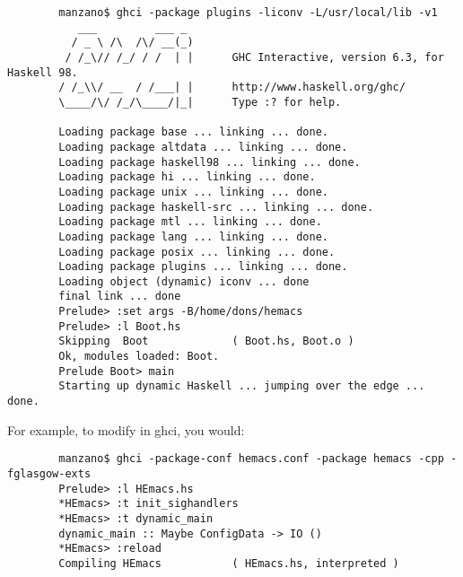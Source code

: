 \begin{verbatim}
        manzano$ ghci -package plugins -liconv -L/usr/local/lib -v1
           ___         ___ _
          / _ \ /\  /\/ __(_)
         / /_\// /_/ / /  | |      GHC Interactive, version 6.3, for Haskell 98.
        / /_\\/ __  / /___| |      http://www.haskell.org/ghc/
        \____/\/ /_/\____/|_|      Type :? for help.

        Loading package base ... linking ... done.
        Loading package altdata ... linking ... done.
        Loading package haskell98 ... linking ... done.
        Loading package hi ... linking ... done.
        Loading package unix ... linking ... done.
        Loading package haskell-src ... linking ... done.
        Loading package mtl ... linking ... done.
        Loading package lang ... linking ... done.
        Loading package posix ... linking ... done.
        Loading package plugins ... linking ... done.
        Loading object (dynamic) iconv ... done
        final link ... done
        Prelude> :set args -B/home/dons/hemacs
        Prelude> :l Boot.hs
        Skipping  Boot             ( Boot.hs, Boot.o )
        Ok, modules loaded: Boot.
        Prelude Boot> main
        Starting up dynamic Haskell ... jumping over the edge ... done.
\end{verbatim}

For example, to modify  in ghci, you would:
\begin{verbatim}
        manzano$ ghci -package-conf hemacs.conf -package hemacs -cpp -fglasgow-exts
        Prelude> :l HEmacs.hs
        *HEmacs> :t init_sighandlers
        *HEmacs> :t dynamic_main
        dynamic_main :: Maybe ConfigData -> IO ()
        *HEmacs> :reload
        Compiling HEmacs           ( HEmacs.hs, interpreted )
\end{verbatim}
